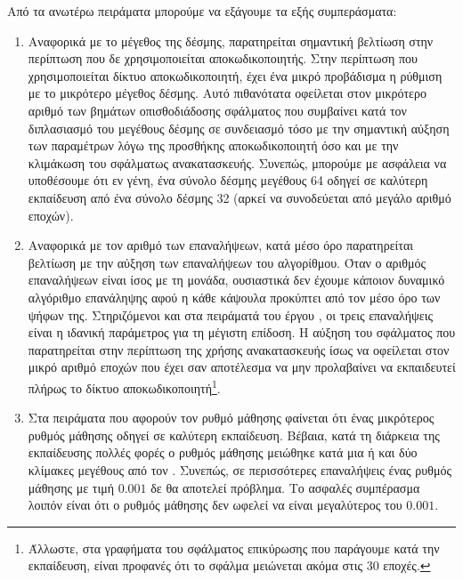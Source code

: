 Από τα ανωτέρω πειράματα μπορούμε να εξάγουμε τα εξής συμπεράσματα:
\begin{enumerate}
    \item Αναφορικά με το μέγεθος της δέσμης, παρατηρείται σημαντική βελτίωση στην περίπτωση που δε χρησιμοποιείται αποκωδικοποιητής. Στην περίπτωση που χρησιμοποιείται δίκτυο αποκωδικοποιητή, έχει ένα μικρό προβάδισμα η ρύθμιση με το μικρότερο μέγεθος δέσμης. Αυτό πιθανότατα οφείλεται στον μικρότερο αριθμό των βημάτων οπισθοδιάδοσης σφάλματος που συμβαίνει κατά τον διπλασιασμό του μεγέθους δέσμης σε συνδειασμό τόσο με την σημαντική αύξηση των παραμέτρων λόγω της προσθήκης αποκωδικοποιητή όσο και με την κλιμάκωση του σφάλματως ανακατασκευής. Συνεπώς, μπορούμε με ασφάλεια να υποθέσουμε ότι εν γένη, ένα σύνολο δέσμης μεγέθους 64 οδηγεί σε καλύτερη εκπαίδευση από ένα σύνολο δέσμης 32 (αρκεί να συνοδεύεται από μεγάλο αριθμό εποχών).
    \item Αναφορικά με τον αριθμό των επαναλήψεων, κατά μέσο όρο παρατηρείται βελτίωση με την αύξηση των επαναλήψεων του αλγορίθμου. Όταν ο αριθμός επαναλήψεων είναι ίσος με τη μονάδα, ουσιαστικά δεν έχουμε κάποιον δυναμικό αλγόριθμο επανάληψης αφού η κάθε κάψουλα  προκύπτει από τον μέσο όρο των ψήφων της. Στηριζόμενοι και στα πειράματά του έργου \cite{sabour2017dynamic}, οι τρεις επαναλήψεις είναι η ιδανική παράμετρος για τη μέγιστη επίδοση. Η αύξηση του σφάλματος που παρατηρείται στην περίπτωση της χρήσης ανακατασκευής ίσως να οφείλεται στον μικρό αριθμό εποχών που έχει σαν αποτέλεσμα να μην προλαβαίνει να εκπαιδευτεί πλήρως το δίκτυο αποκωδικοποιητή\footnote{Άλλωστε, στα γραφήματα του σφάλματος επικύρωσης που παράγουμε κατά την εκπαίδευση, είναι προφανές ότι το σφάλμα μειώνεται ακόμα στις 30 εποχές.}.
    \item Στα πειράματα που αφορούν τον ρυθμό μάθησης φαίνεται ότι ένας μικρότερος ρυθμός μάθησης οδηγεί σε καλύτερη εκπαίδευση. Βέβαια, κατά τη διάρκεια της εκπαίδευσης πολλές φορές ο ρυθμός μάθησης μειώθηκε κατά μια ή και δύο κλίμακες μεγέθους από τον . Συνεπώς, σε περισσότερες επαναλήψεις ένας ρυθμός μάθησης με τιμή $0.001$ δε θα αποτελεί πρόβλημα. Το ασφαλές συμπέρασμα λοιπόν είναι ότι ο ρυθμός μάθησης δεν ωφελεί να είναι μεγαλύτερος του $0.001$.
\end{enumerate}

